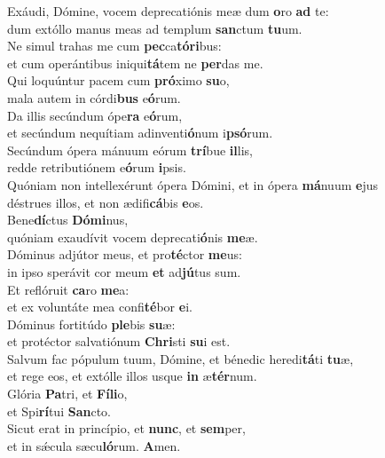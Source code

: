 \evenverse Exáudi, Dómine, vocem deprecatiónis meæ dum \textbf{o}ro \textbf{ad} te:~\*\\
\evenverse dum extóllo manus meas ad templum \textbf{san}ctum \textbf{tu}um.\\
\oddverse Ne simul trahas me cum \textbf{pec}ca\textbf{tó}\textbf{ri}bus:~\*\\
\oddverse et cum operántibus iniqui\textbf{tá}tem ne \textbf{per}das me.\\
\evenverse Qui loquúntur pacem cum \textbf{pró}ximo \textbf{su}o,~\*\\
\evenverse mala autem in córdi\textbf{bus} e\textbf{ó}rum.\\
\oddverse Da illis secúndum ópe\textbf{ra} e\textbf{ó}rum,~\*\\
\oddverse et secúndum nequítiam adinventi\textbf{ó}num i\textbf{psó}rum.\\
\evenverse Secúndum ópera mánuum eórum \textbf{trí}bue \textbf{il}lis,~\*\\
\evenverse redde retributiónem e\textbf{ó}rum \textbf{i}psis.\\
\oddverse Quóniam non intellexérunt ópera Dómini, et in ópera \textbf{má}nuum \textbf{e}jus~\*\\
\oddverse déstrues illos, et non ædifi\textbf{cá}bis \textbf{e}os.\\
\evenverse Bene\textbf{dí}ctus \textbf{Dó}\textbf{mi}nus,~\*\\
\evenverse quóniam exaudívit vocem deprecati\textbf{ó}nis \textbf{me}æ.\\
\oddverse Dóminus adjútor meus, et pro\textbf{té}ctor \textbf{me}us:~\*\\
\oddverse in ipso sperávit cor meum \textbf{et} ad\textbf{jú}tus sum.\\
\evenverse Et reflóruit \textbf{ca}ro \textbf{me}a:~\*\\
\evenverse et ex voluntáte mea confi\textbf{té}bor \textbf{e}i.\\
\oddverse Dóminus fortitúdo \textbf{ple}bis \textbf{su}æ:~\*\\
\oddverse et protéctor salvatiónum \textbf{Chri}sti \textbf{su}i est.\\
\evenverse Salvum fac pópulum tuum, Dómine, et bénedic heredi\textbf{tá}ti \textbf{tu}æ,~\*\\
\evenverse et rege eos, et extólle illos usque \textbf{in} æ\textbf{tér}num.\\
\oddverse Glória \textbf{Pa}tri, et \textbf{Fí}\textbf{li}o,~\*\\
\oddverse et Spi\textbf{rí}tui \textbf{San}cto.\\
\evenverse Sicut erat in princípio, et \textbf{nunc}, et \textbf{sem}per,~\*\\
\evenverse et in sǽcula sæcu\textbf{ló}rum. \textbf{A}men.\\
